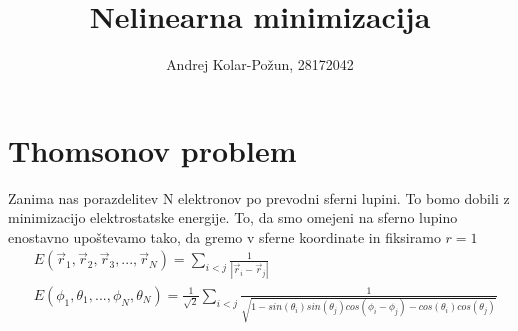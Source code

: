 \documentclass{article}
\title{Nelinearna minimizacija}
\author{Andrej Kolar-Požun, 28172042}
\begin{document}
\maketitle
\newpage
{}

\section{Thomsonov problem}
Zanima nas porazdelitev N elektronov po prevodni sferni lupini. To bomo dobili z minimizacijo elektrostatske energije. To, da smo omejeni na sferno lupino enostavno upoštevamo tako, da gremo v sferne koordinate in fiksiramo $r=1$
\begin{align*}
&E(\vec{r}_1,\vec{r}_2,\vec{r}_3,...,\vec{r}_N) = \sum_{i<j} \frac{1}{|\vec{r}_i - \vec{r}_j|} \\
&E(\phi_1,\theta_1,...,\phi_N,\theta_N) = \frac{1}{\sqrt{2}}\sum_{i<j} \frac{1}{\sqrt{1-sin(\theta_i)sin(\theta_j)cos(\phi_i-\phi_j) - cos(\theta_i)cos(\theta_j)}}
\end{align*}
\end{document}
